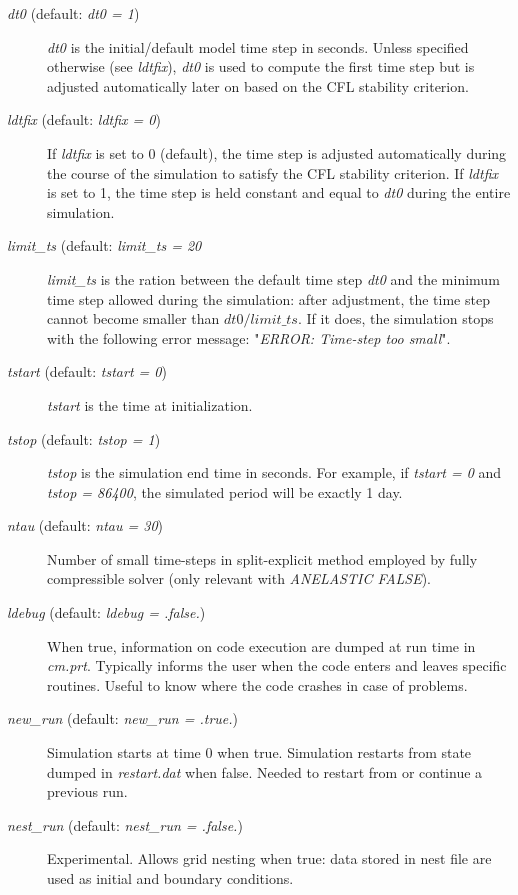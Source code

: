 \documentclass[12pt,A4,french]{article}
\begin{document}
\begin{description}

\item[{\it dt0} (default: {\it dt0 = 1})]

{\it dt0} is the initial/default model time step in seconds. Unless specified otherwise (see {\it ldtfix}), {\it dt0} is used to compute the first time step but is adjusted automatically later on based on the CFL stability criterion.

\item[{\it ldtfix} (default: {\it ldtfix = 0})]

If {\it ldtfix} is set to 0 (default), the time step is adjusted automatically during the course of the simulation to satisfy the CFL stability criterion. If {\it ldtfix} is set to 1, the time step is held constant and equal to {\it dt0} during the entire simulation.

\item[{\it limit\_ts} (default: {\it limit\_ts = 20}]

{\it limit\_ts} is the ration between the default time step {\it dt0} and the minimum time step allowed during the simulation: after adjustment, the time step cannot become smaller than $dt0/limit\_ts$. If it does, the simulation stops with the following error message: "{\it ERROR: Time-step too small}".

\item[{\it tstart} (default: {\it tstart = 0})]

{\it tstart} is the time at initialization. 

\item[{\it tstop} (default: {\it tstop = 1})]

{\it tstop} is the simulation end time in seconds. For example, if {\it tstart = 0} and {\it tstop = 86400}, the simulated period will be exactly 1 day.

\item[{\it ntau} (default: {\it ntau = 30})]

Number of small time-steps in split-explicit method employed by fully compressible solver (only relevant with {\it ANELASTIC FALSE}).

\item[{\it ldebug} (default: {\it ldebug = .false.})]

When true, information on code execution are dumped at run time in {\it cm.prt}. Typically informs the user when the code enters and leaves specific routines. Useful to know where the code crashes in case of problems.

\item[{\it new\_run} (default: {\it new\_run = .true.})]

Simulation starts at time $0$ when true. Simulation restarts from state dumped in {\it restart.dat} when false. Needed to restart from or continue a previous run.

\item[{\it nest\_run} (default: {\it nest\_run = .false.})]

Experimental. Allows grid nesting when true: data stored in nest file are used as initial and boundary conditions.

\end{description}
\end{document}
